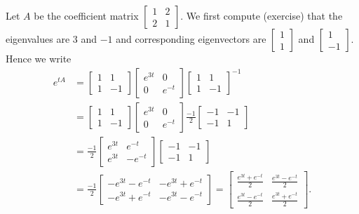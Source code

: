\documentclass[12pt]{book}
\begin{document}
\begin{example}
Let $A$ be the coefficient matrix $\left[ \begin{smallmatrix}
1 & 2 \\
2 & 1
\end{smallmatrix} \right]$.
We first compute (exercise) that the eigenvalues are 3 and $-1$ and 
corresponding eigenvectors are
$\left[ \begin{smallmatrix} 1 \\ 1 \end{smallmatrix} \right]$ and
$\left[ \begin{smallmatrix} 1 \\ -1 \end{smallmatrix} \right]$.
Hence we write
\begin{equation*}
\begin{split}
e^{t A}
& =
\begin{bmatrix}
1 & 1 \\
1 & -1
\end{bmatrix}
\begin{bmatrix}
e^{3t} & 0 \\
0 & e^{-t}
\end{bmatrix}
\begin{bmatrix}
1 & 1 \\
1 & -1
\end{bmatrix}^{-1}
\\
& =
\begin{bmatrix}
1 & 1 \\
1 & -1
\end{bmatrix}
\begin{bmatrix}
e^{3t} & 0 \\
0 & e^{-t}
\end{bmatrix}
\frac{-1}{2}
\begin{bmatrix}
-1 & -1 \\
-1 & 1
\end{bmatrix}
\\
& =
\frac{-1}{2}
\begin{bmatrix}
e^{3t} & e^{-t} \\
e^{3t} & -e^{-t}
\end{bmatrix}
\begin{bmatrix}
-1 & -1 \\
-1 & 1
\end{bmatrix}
\\
& =
\frac{-1}{2}
\begin{bmatrix}
-e^{3t}-e^{-t} & -e^{3t}+e^{-t} \\
-e^{3t}+e^{-t} & -e^{3t}-e^{-t}
\end{bmatrix}
 =
\begin{bmatrix}
\frac{e^{3t}+e^{-t}}{2} & \frac{e^{3t}-e^{-t}}{2} \\
\frac{e^{3t}-e^{-t}}{2} & \frac{e^{3t}+e^{-t}}{2}
\end{bmatrix} .
\end{split}
\end{equation*}


\end{example}
\end{document}

